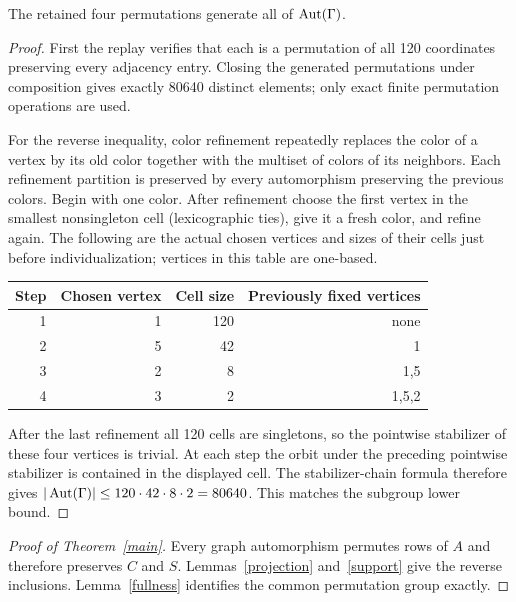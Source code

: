 \documentclass[11pt]{article}
\begin{document}
\begin{lemma}\label{fullness}
The retained four permutations generate all of $\operatorname{Aut}(\Gamma)$.
\end{lemma}
\begin{proof}
First the replay verifies that each is a permutation of all 120 coordinates preserving every adjacency entry. Closing the generated permutations under composition gives exactly 80640 distinct elements; only exact finite permutation operations are used.

For the reverse inequality, color refinement repeatedly replaces the color of a vertex by its old color together with the multiset of colors of its neighbors. Each refinement partition is preserved by every automorphism preserving the previous colors. Begin with one color. After refinement choose the first vertex in the smallest nonsingleton cell (lexicographic ties), give it a fresh color, and refine again. The following are the actual chosen vertices and sizes of their cells just before individualization; vertices in this table are one-based.
\begin{center}\begin{tabular}{rrrr}\toprule
Step&Chosen vertex&Cell size&Previously fixed vertices\\\midrule
1&1&120&none\\
2&5&42&1\\
3&2&8&1,5\\
4&3&2&1,5,2\\\bottomrule
\end{tabular}\end{center}
After the last refinement all 120 cells are singletons, so the pointwise stabilizer of these four vertices is trivial. At each step the orbit under the preceding pointwise stabilizer is contained in the displayed cell. The stabilizer-chain formula therefore gives
$|\operatorname{Aut}(\Gamma)|\le120\cdot42\cdot8\cdot2=80640$.
This matches the subgroup lower bound.
\end{proof}

\newpage
\begin{proof}[Proof of Theorem~\ref{main}]
Every graph automorphism permutes rows of $A$ and therefore preserves $C$ and $S$. Lemmas~\ref{projection} and~\ref{support} give the reverse inclusions. Lemma~\ref{fullness} identifies the common permutation group exactly.
\end{proof}
\end{document}

